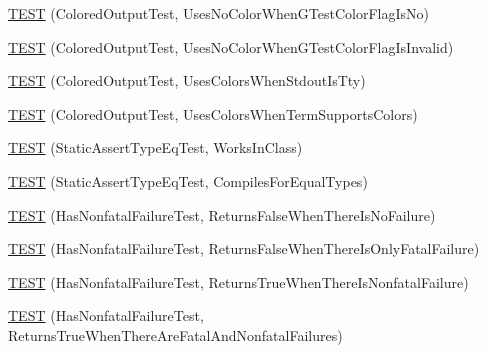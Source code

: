 \begin{DoxyCompactItemize}
\item 
\mbox{\hyperlink{_obj__test_2lib_2googletest-release-1_88_81_2googletest_2test_2gtest__unittest_8cc_aac5bec0b24eebf52985abcd6234335fe}{T\+E\+ST}} (Colored\+Output\+Test, Uses\+No\+Color\+When\+G\+Test\+Color\+Flag\+Is\+No)
\item 
\mbox{\hyperlink{_obj__test_2lib_2googletest-release-1_88_81_2googletest_2test_2gtest__unittest_8cc_a7f15883b04b4975f604be288955952fb}{T\+E\+ST}} (Colored\+Output\+Test, Uses\+No\+Color\+When\+G\+Test\+Color\+Flag\+Is\+Invalid)
\item 
\mbox{\hyperlink{_obj__test_2lib_2googletest-release-1_88_81_2googletest_2test_2gtest__unittest_8cc_a2a995937bc9d0b16d65e5bcaa5fc781e}{T\+E\+ST}} (Colored\+Output\+Test, Uses\+Colors\+When\+Stdout\+Is\+Tty)
\item 
\mbox{\hyperlink{_obj__test_2lib_2googletest-release-1_88_81_2googletest_2test_2gtest__unittest_8cc_a6dd6677e63340771dc55ad96a0697f11}{T\+E\+ST}} (Colored\+Output\+Test, Uses\+Colors\+When\+Term\+Supports\+Colors)
\item 
\mbox{\hyperlink{_obj__test_2lib_2googletest-release-1_88_81_2googletest_2test_2gtest__unittest_8cc_a267c6521e900e2d6096653f1b0df7f32}{T\+E\+ST}} (Static\+Assert\+Type\+Eq\+Test, Works\+In\+Class)
\item 
\mbox{\hyperlink{_obj__test_2lib_2googletest-release-1_88_81_2googletest_2test_2gtest__unittest_8cc_a896a075b2d244e3961f0fb3c13614f2b}{T\+E\+ST}} (Static\+Assert\+Type\+Eq\+Test, Compiles\+For\+Equal\+Types)
\item 
\mbox{\hyperlink{_obj__test_2lib_2googletest-release-1_88_81_2googletest_2test_2gtest__unittest_8cc_a9f9166027da63504b2306b8f5e5a88b1}{T\+E\+ST}} (Has\+Nonfatal\+Failure\+Test, Returns\+False\+When\+There\+Is\+No\+Failure)
\item 
\mbox{\hyperlink{_obj__test_2lib_2googletest-release-1_88_81_2googletest_2test_2gtest__unittest_8cc_ad25e0382fb27cfff590e2c104c504dff}{T\+E\+ST}} (Has\+Nonfatal\+Failure\+Test, Returns\+False\+When\+There\+Is\+Only\+Fatal\+Failure)
\item 
\mbox{\hyperlink{_obj__test_2lib_2googletest-release-1_88_81_2googletest_2test_2gtest__unittest_8cc_a1d7caf8788fecd939c4a4e23c23e52ff}{T\+E\+ST}} (Has\+Nonfatal\+Failure\+Test, Returns\+True\+When\+There\+Is\+Nonfatal\+Failure)
\item 
\mbox{\hyperlink{_obj__test_2lib_2googletest-release-1_88_81_2googletest_2test_2gtest__unittest_8cc_a7df9189826b8aab71331bb7fec0b57cb}{T\+E\+ST}} (Has\+Nonfatal\+Failure\+Test, Returns\+True\+When\+There\+Are\+Fatal\+And\+Nonfatal\+Failures)

\end{DoxyCompactItemize}
